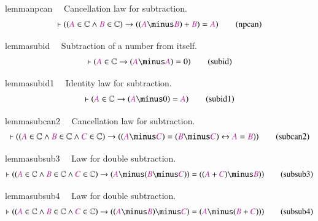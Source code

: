 \begin{restatable}{lemma}{npcan}~~ Cancellation law for subtraction. 
~
     ~
\begin{align}
\vdash ( ( \mc{A} \in \mathbb{C} \wedge \mc{B} \in \mathbb{C} ) \rightarrow ( (
    \mc{A} \minus \mc{B} ) + \mc{B} ) = \mc{A} )\label{eq:npcan}\tag{npcan}
\end{align}
\end{restatable}

\begin{restatable}{lemma}{subid}~~ Subtraction of a number from itself. 
~
     ~
\begin{align}
\vdash ( \mc{A} \in \mathbb{C} \rightarrow ( \mc{A} \minus \mc{A} ) = 0
    )\label{eq:subid}\tag{subid}
\end{align}
\end{restatable}

\begin{restatable}{lemma}{subid1}~~ Identity law for subtraction.  
\begin{align}
\vdash ( \mc{A} \in \mathbb{C} \rightarrow ( \mc{A} \minus 0 ) = \mc{A}
    )\label{eq:subid1}\tag{subid1}
\end{align}
\end{restatable}

\begin{restatable}{lemma}{subcan2}~~ Cancellation law for subtraction. 
~
\begin{align}
\vdash ( ( \mc{A} \in \mathbb{C} \wedge \mc{B} \in \mathbb{C} \wedge \mc{C} \in
    \mathbb{C} ) \rightarrow ( ( \mc{A} \minus \mc{C} ) = ( \mc{B} \minus
    \mc{C} ) \leftrightarrow \mc{A} = \mc{B} ) )\label{eq:subcan2}\tag{subcan2}
\end{align}
\end{restatable}

\begin{restatable}{lemma}{subsub3}~~ Law for double subtraction.  
\begin{align}
\vdash ( ( \mc{A} \in \mathbb{C} \wedge \mc{B} \in \mathbb{C} \wedge \mc{C} \in
    \mathbb{C} ) \rightarrow ( \mc{A} \minus ( \mc{B} \minus \mc{C} ) ) = ( (
    \mc{A} + \mc{C} ) \minus \mc{B} ) )\label{eq:subsub3}\tag{subsub3}
\end{align}
\end{restatable}

\begin{restatable}{lemma}{subsub4}~~ Law for double subtraction.  
\begin{align}
\vdash ( ( \mc{A} \in \mathbb{C} \wedge \mc{B} \in \mathbb{C} \wedge \mc{C} \in
    \mathbb{C} ) \rightarrow ( ( \mc{A} \minus \mc{B} ) \minus \mc{C} ) = (
    \mc{A} \minus ( \mc{B} + \mc{C} ) ) )\label{eq:subsub4}\tag{subsub4}
\end{align}
\end{restatable}

